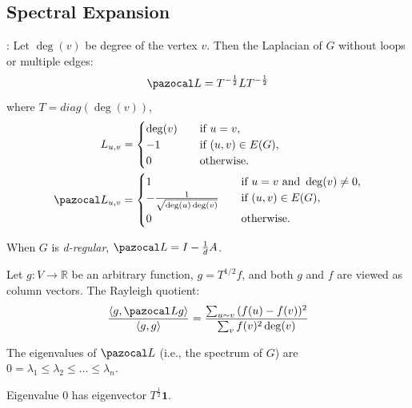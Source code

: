 \subsection{Spectral Expansion}

\cite{chu97}: Let $\deg(v)$ be degree of the vertex $v$. Then the Laplacian of $G$ without loops or multiple edges:
\begin{equation}
    \Laplacian=T^{-\frac{1}{2}}LT^{-\frac{1}{2}}
\end{equation}
where $T=diag(\deg(v))$,
\begin{align}
    L_{u,v}&=
    \begin{cases}
        \deg(v) & \quad \text{if } u=v \text{,}\\
        -1      & \quad \text{if } (u,v)\in E(G),\\
        0       & \quad \text{otherwise.}
    \end{cases}\\
    \Laplacian_{u,v}&=
    \begin{cases}
        1                                   & \quad \text{if } u=v \text{ and } \deg(v) \neq 0 \text{,}\\
        -\frac{1}{\sqrt{\deg(u)\deg(v)}}    & \quad \text{if } (u,v)\in E(G),\\
        0                                   & \quad \text{otherwise.}
    \end{cases}
\end{align}


When $G$ is \textit{d-regular}, $\Laplacian=I-\frac{1}{d}A$.

Let $g:V\to\mathbb{R}$ be an arbitrary function, $g=T^{1/2}f$,
and both $g$ and $f$ are viewed as column vectors.
The Rayleigh quotient:
\begin{equation}
    \frac{\langle g,\Laplacian g \rangle}{\langle g,g \rangle}
    =\frac{\sum_{u \sim v}{(f(u)-f(v))^2}}{\sum_{v}{f(v)^2\deg(v)}}
\end{equation}

The eigenvalues of $\Laplacian$ (i.e., the spectrum of $G$) are $0=\lambda_1 \leq \lambda_2 \leq \dots \leq \lambda_{n}$.

Eigenvalue $0$ has eigenvector $T^{\frac{1}{2}}\mathbf{1}$.

